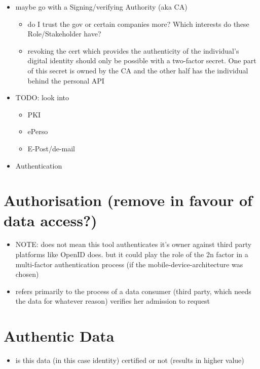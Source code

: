 \documentclass[12pt,english,a4paper,titlepage,cleardoublepage=empty,dottedtoc]{report}
\providecommand{\tightlist}{%
  \setlength{\itemsep}{0pt}\setlength{\parskip}{0pt}}
\begin{document}
\begin{itemize}
\tightlist
\item
  maybe go with a Signing/verifying Authority (aka CA)

  \begin{itemize}
  \tightlist
  \item
    do I trust the gov or certain companies more? Which interests do
    these Role/Stakeholder have?
  \item
    revoking the cert which provides the authenticity of the
    individual's digital identity should only be possible with a
    two-factor secret. One part of this secret is owned by the CA and
    the other half has the individual behind the personal API
  \end{itemize}
\item
  TODO: look into

  \begin{itemize}
  \tightlist
  \item
    PKI
  \item
    ePerso
  \item
    E-Post/de-mail
  \end{itemize}
\item
  Authentication
\end{itemize}

\section{Authorisation (remove in favour of data
access?)}\label{authorisation-remove-in-favour-of-data-access}

\begin{itemize}
\tightlist
\item
  NOTE: does not mean this tool authenticates it's owner against third
  party platforms like OpenID does. but it could play the role of the 2n
  factor in a multi-factor authentication process (if the
  mobile-device-architecture was chosen)
\item
  refers primarily to the process of a data consumer (third party, which
  needs the data for whatever reason) verifies her admission to request
\end{itemize}

\section{Authentic Data}\label{authentic-data}

\begin{itemize}
\tightlist
\item
  is this data (in this case identity) certified or not (results in
  higher value)
\end{itemize}
\end{document}
